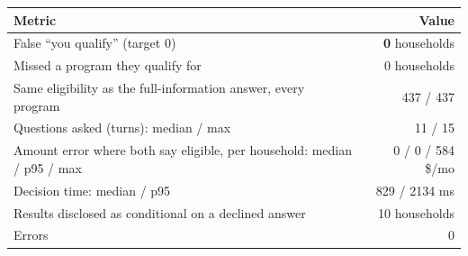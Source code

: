 \begin{tabular}{lr}
\toprule
Metric & Value \\
\midrule
False ``you qualify'' (target 0) & \textbf{0} households \\
Missed a program they qualify for & 0 households \\
Same eligibility as the full-information answer, every program & 437 / 437 \\
Questions asked (turns): median / max & 11 / 15 \\
Amount error where both say eligible, per household: median / p95 / max & 0 / 0 / 584 \$/mo \\
Decision time: median / p95 & 829 / 2134 ms \\
Results disclosed as conditional on a declined answer & 10 households \\
Errors & 0 \\
\bottomrule
\end{tabular}

